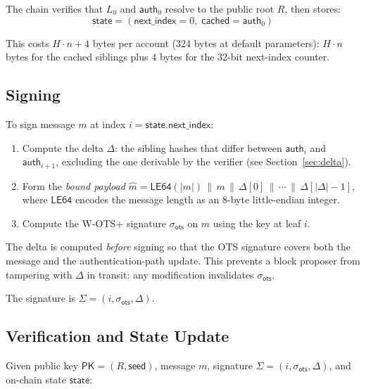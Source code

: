 \documentclass[11pt]{article}
\newcommand{\concat}{\,\|\,}
\begin{document}
The chain verifies that $L_0$ and $\mathsf{auth}_0$ resolve to the
public root $R$, then stores:
\[
\mathsf{state} = (\mathsf{next\_index} = 0,\; \mathsf{cached} =
\mathsf{auth}_0)
\]

This costs $H \cdot n + 4$ bytes per account (324 bytes at default
parameters): $H \cdot n$ bytes for the cached siblings plus $4$ bytes
for the 32-bit next-index counter.

\subsection{Signing}

To sign message $m$ at index $i = \mathsf{state.next\_index}$:

\begin{enumerate}
\item Compute the delta $\Delta$: the sibling hashes that differ between
$\mathsf{auth}_i$ and $\mathsf{auth}_{i+1}$, excluding the one
derivable by the verifier (see Section~\ref{sec:delta}).
\item Form the \emph{bound payload}
$\hat{m} = \mathsf{LE64}(|m|) \concat m \concat \Delta[0] \concat
\cdots \concat \Delta[|\Delta|-1]$, where $\mathsf{LE64}$ encodes the
message length as an 8-byte little-endian integer.
\item Compute the W-OTS+ signature $\sigma_{\mathsf{ots}}$ on $\hat{m}$
using the key at leaf $i$.
\end{enumerate}

The delta is computed \emph{before} signing so that the OTS signature
covers both the message and the authentication-path update. This
prevents a block proposer from tampering with $\Delta$ in transit: any
modification invalidates $\sigma_{\mathsf{ots}}$.

The signature is $\Sigma = (i, \sigma_{\mathsf{ots}}, \Delta)$.

\subsection{Verification and State Update}

Given public key $\mathsf{PK} = (R, \mathsf{seed})$, message $m$,
signature $\Sigma = (i, \sigma_{\mathsf{ots}}, \Delta)$, and on-chain
state $\mathsf{state}$:
\end{document}
